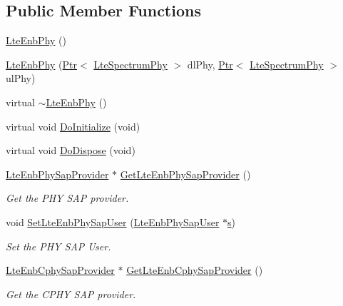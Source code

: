 \subsection*{Public Member Functions}
\begin{DoxyCompactItemize}
\item 
\hyperlink{classns3_1_1LteEnbPhy_a879bdf4f544a2d7fd73017b371953ee7}{Lte\+Enb\+Phy} ()
\item 
\hyperlink{classns3_1_1LteEnbPhy_a72f891a2ba978ecd748e8f35a9ade3e4}{Lte\+Enb\+Phy} (\hyperlink{classns3_1_1Ptr}{Ptr}$<$ \hyperlink{classns3_1_1LteSpectrumPhy}{Lte\+Spectrum\+Phy} $>$ dl\+Phy, \hyperlink{classns3_1_1Ptr}{Ptr}$<$ \hyperlink{classns3_1_1LteSpectrumPhy}{Lte\+Spectrum\+Phy} $>$ ul\+Phy)
\item 
virtual \hyperlink{classns3_1_1LteEnbPhy_a01e77f123bb8a78ebdc9ac8298a99f2d}{$\sim$\+Lte\+Enb\+Phy} ()
\item 
virtual void \hyperlink{classns3_1_1LteEnbPhy_a404572fbc4d6948034038b91bf450877}{Do\+Initialize} (void)
\item 
virtual void \hyperlink{classns3_1_1LteEnbPhy_a1610567d587307ec10131a95ebbbf856}{Do\+Dispose} (void)
\item 
\hyperlink{classns3_1_1LteEnbPhySapProvider}{Lte\+Enb\+Phy\+Sap\+Provider} $\ast$ \hyperlink{classns3_1_1LteEnbPhy_a235c25e3f4276ff148cc22a047c24da2}{Get\+Lte\+Enb\+Phy\+Sap\+Provider} ()
\begin{DoxyCompactList}\small\item\em Get the P\+HY S\+AP provider. \end{DoxyCompactList}\item 
void \hyperlink{classns3_1_1LteEnbPhy_a25c8f0db61ad10a7171d11d7e2399c13}{Set\+Lte\+Enb\+Phy\+Sap\+User} (\hyperlink{classns3_1_1LteEnbPhySapUser}{Lte\+Enb\+Phy\+Sap\+User} $\ast$\hyperlink{generate__test__data__lte__sinr_8m_ad83eeb3a142285d1243a08c6b7026df8}{s})
\begin{DoxyCompactList}\small\item\em Set the P\+HY S\+AP User. \end{DoxyCompactList}\item 
\hyperlink{classns3_1_1LteEnbCphySapProvider}{Lte\+Enb\+Cphy\+Sap\+Provider} $\ast$ \hyperlink{classns3_1_1LteEnbPhy_aeeca16c36e52552da1a869e34f067fb2}{Get\+Lte\+Enb\+Cphy\+Sap\+Provider} ()
\begin{DoxyCompactList}\small\item\em Get the C\+P\+HY S\+AP provider. \end{DoxyCompactList}\item 

\end{DoxyCompactItemize}
